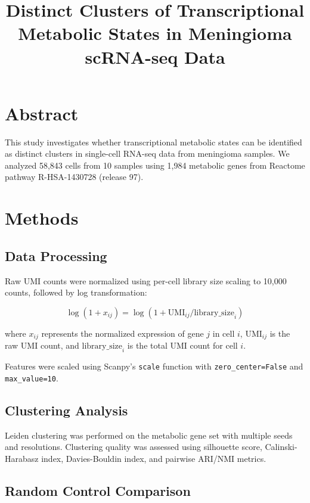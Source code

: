 \documentclass[sloppy]{article}
\title{Distinct Clusters of Transcriptional Metabolic States in Meningioma scRNA-seq Data}
\author{}
\date{}
\begin{document}
\sloppy

\maketitle

\section{Abstract}

This study investigates whether transcriptional metabolic states can be identified as distinct clusters in single-cell RNA-seq data from meningioma samples. We analyzed 58,843 cells from 10 samples using 1,984 metabolic genes from Reactome pathway R-HSA-1430728 (release 97).

\section{Methods}

\subsection{Data Processing}

Raw UMI counts were normalized using per-cell library size scaling to 10,000 counts, followed by log transformation:

\begin{equation}
\label{eq:normalize}
\log(1 + x_{ij}) = \log(1 + \text{UMI}_{ij} / \text{library\_size}_i)
\end{equation}

where $x_{ij}$ represents the normalized expression of gene $j$ in cell $i$, $\text{UMI}_{ij}$ is the raw UMI count, and $\text{library\_size}_i$ is the total UMI count for cell $i$.

Features were scaled using Scanpy's \texttt{scale} function with \texttt{zero\_center=False} and \texttt{max\_value=10}.

\subsection{Clustering Analysis}

Leiden clustering was performed on the metabolic gene set with multiple seeds and resolutions. Clustering quality was assessed using silhouette score, Calinski-Harabasz index, Davies-Bouldin index, and pairwise ARI/NMI metrics.

\subsection{Random Control Comparison}
\end{document}
